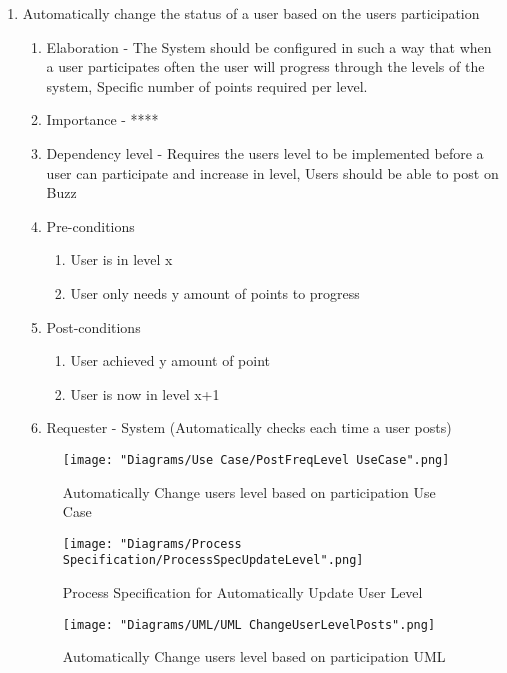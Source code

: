 \documentclass[12pt]{article}
\begin{document}
\begin{enumerate}
\clearpage %
   \item Automatically change the status of a user based on the users participation %
  \begin{enumerate}
    \item Elaboration - The System should be configured in such a way that when a user participates often the user will progress through the levels of the system, Specific number of points required per level.
    \item Importance - ****
    \item Dependency level - Requires the users level to be implemented before a user can participate and increase in level, Users should be able to post on Buzz
    \item Pre-conditions
    \begin{enumerate}
    	\item User is in level x
    	\item User only needs y amount of points to progress
    \end{enumerate}
        \item Post-conditions
    \begin{enumerate}
    	\item User achieved y amount of point
    	\item User is now in level x+1
    \end{enumerate}
    \item Requester - System (Automatically checks each time a user posts)
  \end{enumerate}
\begin{figure}[h]
	\centering
	\texttt{[image: "Diagrams/Use Case/PostFreqLevel UseCase".png]}
	\caption{Automatically Change users level based on participation Use Case}
\end{figure}
\begin{figure}[h]
	\centering
	\texttt{[image: "Diagrams/Process Specification/ProcessSpecUpdateLevel".png]}
	\caption{Process Specification for Automatically Update User Level}
\end{figure} 
\begin{figure}[h]
	\centering
	\texttt{[image: "Diagrams/UML/UML ChangeUserLevelPosts".png]}
	\caption{Automatically Change users level based on participation UML}
\end{figure}
\clearpage %


\end{enumerate}
\end{document}
